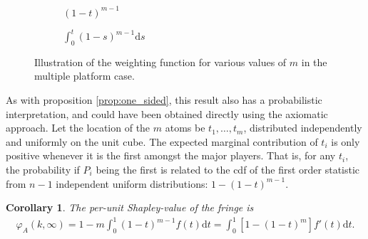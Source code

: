 \documentclass[a4paper]{article}
\newtheorem{corollary}{Corollary}
\newcommand{\dt}{\mathrm{d}t}
\newcommand{\ds}{\mathrm{d}s}
\begin{document}
\begin{figure}[ht]
    \centering
    \begin{subfigure}[b]{0.45\textwidth}
        \centering
        \caption{$(1 - t) ^ {m - 1}$}
    \end{subfigure}
    \begin{subfigure}[b]{0.45\textwidth}
        \centering
        \caption{$\int_0^t (1 - s) ^ {m - 1} \ds$}
    \end{subfigure}
    \caption{Illustration of the weighting function for various values of $m$ in the multiple platform case.}
    \label{fig:multiple_platforms}
\end{figure}

As with proposition \ref{prop:one_sided}, this result also has a probabilistic interpretation, and could have been obtained directly using the axiomatic approach.
Let the location of the $m$ atoms be $t_1, \dots, t_m$, distributed independently and uniformly on the unit cube.
The expected marginal contribution of $t_i$ is only positive whenever it is the first amongst the major players.
That is, for any $t_i$, the probability if $P_i$ being the first is related to the cdf of the first order statistic from $n-1$ independent uniform distributions: $1 - (1-t)^{m-1}$.

\begin{corollary}
    \label{cor:multiple_platforms}
    The per-unit Shapley-value of the fringe is
    \begin{align*}
        \varphi_A(k, \infty) = 1 - m\int_0^1 (1-t) ^ {m-1} f(t) \dt = \int_0^1 [1 - (1-t)^m] f'(t) \dt .
    \end{align*}
\end{corollary}
\end{document}
